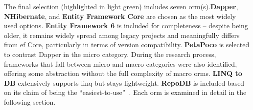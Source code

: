 The final selection (highlighted in light green) includes seven \acrshort{orm}(s).\textbf{Dapper}, \textbf{NHibernate}, and \textbf{Entity Framework Core} are chosen as the most widely used options. \textbf{Entity Framework 6} is included for completeness -- despite being older, it remains widely spread among legacy projects and meaningfully differs from \acrshort{ef} Core, particularly in terms of version compatibility. \textbf{PetaPoco} is selected to contrast Dapper in the micro category. During the research process, frameworks that fall between micro and macro categories were also identified, offering some abstraction without the full complexity of macro \acrshort{orm}s. \textbf{LINQ to DB} extensively supports \acrshort{linq} but stays lightweight. \textbf{RepoDB} is included based on its claim of being the ``easiest-to-use''~\cite{RepoDB}. Each \acrshort{orm} is examined in detail in the following section.